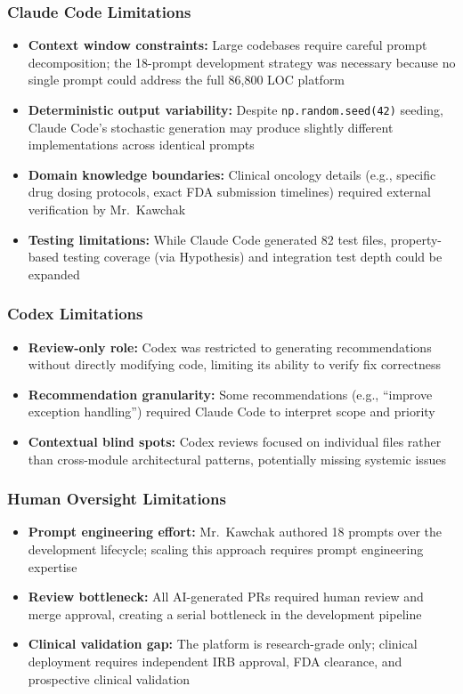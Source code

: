 \subsubsection{Claude Code Limitations}
\begin{itemize}
  \item \textbf{Context window constraints:} Large codebases require careful prompt decomposition; the 18-prompt development strategy was necessary because no single prompt could address the full 86,800 LOC platform
  \item \textbf{Deterministic output variability:} Despite \texttt{np.random.seed(42)} seeding, Claude Code's stochastic generation may produce slightly different implementations across identical prompts
  \item \textbf{Domain knowledge boundaries:} Clinical oncology details (e.g., specific drug dosing protocols, exact FDA submission timelines) required external verification by Mr.\ Kawchak
  \item \textbf{Testing limitations:} While Claude Code generated 82 test files, property-based testing coverage (via Hypothesis) and integration test depth could be expanded
\end{itemize}

\subsubsection{Codex Limitations}
\begin{itemize}
  \item \textbf{Review-only role:} Codex was restricted to generating recommendations without directly modifying code, limiting its ability to verify fix correctness
  \item \textbf{Recommendation granularity:} Some recommendations (e.g., ``improve exception handling'') required Claude Code to interpret scope and priority
  \item \textbf{Contextual blind spots:} Codex reviews focused on individual files rather than cross-module architectural patterns, potentially missing systemic issues
\end{itemize}

\subsubsection{Human Oversight Limitations}
\begin{itemize}
  \item \textbf{Prompt engineering effort:} Mr.\ Kawchak authored 18 prompts over the development lifecycle; scaling this approach requires prompt engineering expertise
  \item \textbf{Review bottleneck:} All AI-generated PRs required human review and merge approval, creating a serial bottleneck in the development pipeline
  \item \textbf{Clinical validation gap:} The platform is research-grade only; clinical deployment requires independent IRB approval, FDA clearance, and prospective clinical validation
\end{itemize}

